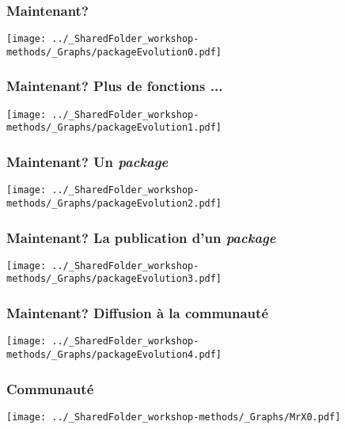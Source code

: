 \documentclass{beamer}
\begin{document}
    \begin{frame}
        \frametitle{Maintenant?} \vspace{1cm}
        \begin{center}
            \texttt{[image: ../\_SharedFolder\_workshop-methods/\_Graphs/packageEvolution0.pdf]}
        \end{center}
    \end{frame} 
    
    \begin{frame}
        \frametitle{Maintenant? Plus de fonctions \R ...} \vspace{1cm}
        \begin{center}
            \texttt{[image: ../\_SharedFolder\_workshop-methods/\_Graphs/packageEvolution1.pdf]}
        \end{center}
    \end{frame} 
    
    \begin{frame}
        \frametitle{Maintenant? Un \emph{package} \R} \vspace{1cm}
        \begin{center}
            \texttt{[image: ../\_SharedFolder\_workshop-methods/\_Graphs/packageEvolution2.pdf]}
        \end{center}
    \end{frame} 
    
    \begin{frame}
        \frametitle{Maintenant? La publication d'un \emph{package}} \vspace{1cm}
        \begin{center}
            \texttt{[image: ../\_SharedFolder\_workshop-methods/\_Graphs/packageEvolution3.pdf]}
        \end{center}
    \end{frame} 
    
    \begin{frame}
        \frametitle{Maintenant? Diffusion à la communauté} \vspace{1cm}
        \begin{center}
            \texttt{[image: ../\_SharedFolder\_workshop-methods/\_Graphs/packageEvolution4.pdf]}
        \end{center}
    \end{frame} 
    
    \begin{frame}
        \frametitle{Communauté \R} \vspace{1cm}
        \begin{center}
            \texttt{[image: ../\_SharedFolder\_workshop-methods/\_Graphs/MrX0.pdf]}
        \end{center}
    \end{frame}
    
\end{document}
